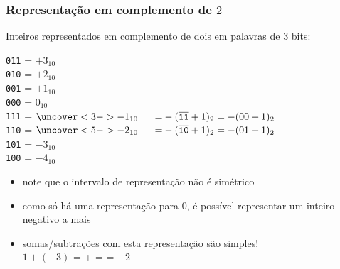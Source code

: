 \documentclass{beamer}
\newcommand{\WD}[1]{\fbox{#1}\hspace{-0.5pt}}
\begin{document}
\begin{frame}[fragile]
\frametitle{Representação em complemento de $2$}

Inteiros representados em complemento de dois em palavras de $3$ bits:

\texttt{011} = $+3_{10}$\\
\texttt{010} = $+2_{10}$\\
\texttt{001} = $+1_{10}$\\
\texttt{000} = $0_{10}$\\
\pause
\texttt{111} = $\uncover<3->{-1_{10} \hspace{5mm} =} -(\overline{\texttt{11}} + 1)_2 = -(00 + 1)_2$\\
\pause
\pause
\texttt{110} = $\uncover<5->{-2_{10} \hspace{5mm} =} -(\overline{\texttt{10}} + 1)_2 = -(01 + 1)_2$\\
\pause
\pause
\texttt{101} = $-3_{10}$\\
\pause
\texttt{100} = $-4_{10}$\\

\pause

\begin{itemize}
\item note que o intervalo de representação não é simétrico
\item como só há uma representação para $0$, é possível representar um inteiro negativo a mais
\item somas/subtrações com esta representação são simples!\\
$1 + (-3)$ = \WD{0}\WD{0}\WD{1} + \WD{1}\WD{0}\WD{1} = \WD{1}\WD{1}\WD{0} = $-2$
\end{itemize}

\end{frame}
\end{document}
